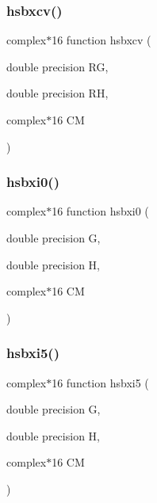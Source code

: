 \mbox{\label{djangoh__h_8f_a8b69a1c6406582be624108c3aeda9778}} 
\subsubsection{\texorpdfstring{hsbxcv()}{hsbxcv()}}
{\footnotesize\ttfamily complex$\ast$16 function hsbxcv (\begin{DoxyParamCaption}\item[{double precision}]{RG,  }\item[{double precision}]{RH,  }\item[{complex$\ast$16}]{CM }\end{DoxyParamCaption})}

\mbox{\label{djangoh__h_8f_a492a2e1e1e804fc597f8106ff0f9d32d}} 
\subsubsection{\texorpdfstring{hsbxi0()}{hsbxi0()}}
{\footnotesize\ttfamily complex$\ast$16 function hsbxi0 (\begin{DoxyParamCaption}\item[{double precision}]{G,  }\item[{double precision}]{H,  }\item[{complex$\ast$16}]{CM }\end{DoxyParamCaption})}

\mbox{\label{djangoh__h_8f_a1621d429d11e21c0ae1599f626901aea}} 
\subsubsection{\texorpdfstring{hsbxi5()}{hsbxi5()}}
{\footnotesize\ttfamily complex$\ast$16 function hsbxi5 (\begin{DoxyParamCaption}\item[{double precision}]{G,  }\item[{double precision}]{H,  }\item[{complex$\ast$16}]{CM }\end{DoxyParamCaption})}

